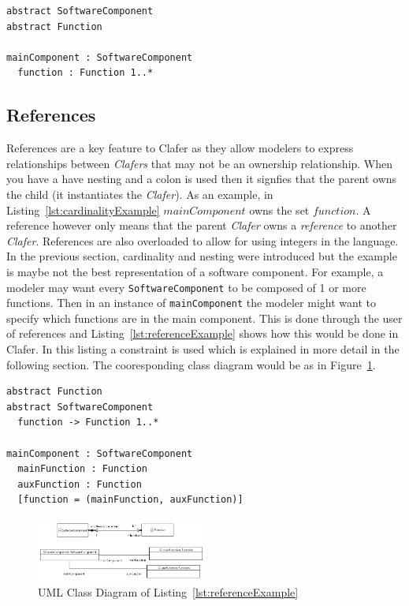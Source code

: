 \documentclass[10pt,oneside]{IEEEtran}
\begin{document}
\begin{lstlisting}[label={lst:cardinalityExample},caption={Example of nesting and cardinality}]
abstract SoftwareComponent
abstract Function

mainComponent : SoftwareComponent
  function : Function 1..*
\end{lstlisting}

\subsection{References}
References are a key feature to Clafer as they allow modelers to express relationships between
\textit{Clafers} that may not be an ownership relationship. When you have a have nesting and a colon is used then it signfies that the parent owns the child (it instantiates the \textit{Clafer}). As an example, in Listing~\ref{lst:cardinalityExample} $mainComponent$ owns the set $function$. A reference however only means that the parent \textit{Clafer} owns a \textit{reference} to another \textit{Clafer}. References are also overloaded to allow for using integers in the language. In the previous section, cardinality and nesting were introduced but the example is maybe not the best representation of a software component. For example, a modeler may want every \lstinline$SoftwareComponent$ to be composed of 1 or more functions. Then in an instance of \lstinline$mainComponent$ the modeler might want to specify which functions are in the main component. This is done through the user of references and Listing~\ref{lst:referenceExample} shows how this would be done in Clafer. In this listing a constraint is used which is explained in more detail in the following section. The cooresponding class diagram would be as in Figure~\ref{fig:UML_Class_Diagram_partD}.

\begin{lstlisting}[label={lst:referenceExample},caption={Example use of references}]
abstract Function
abstract SoftwareComponent
  function -> Function 1..*

mainComponent : SoftwareComponent
  mainFunction : Function
  auxFunction : Function
  [function = (mainFunction, auxFunction)]
\end{lstlisting}

\begin{figure}[h]
  \caption{UML Class Diagram of Listing~\ref{lst:referenceExample}}
  \label{fig:UML_Class_Diagram_partD}
  \centering
  \includegraphics[width=0.5\textwidth]{UML_Class_Diagram_partD}
\end{figure}
\end{document}
